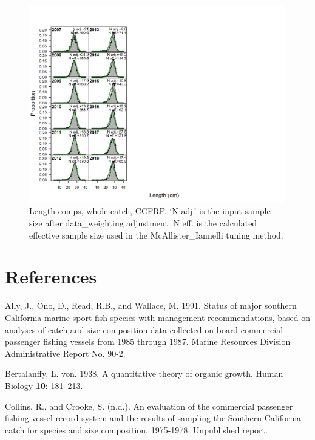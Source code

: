 \documentclass[12pt,]{article}
\begin{document}
\begin{figure}
\centering
\includegraphics{./r4ss/plots_mod1/comp_lenfit_flt9mkt0.png}
\caption{Length comps, whole catch, CCFRP. `N adj.' is the input sample
size after data\_weighting adjustment. N eff. is the calculated
effective sample size used in the McAllister\_Iannelli tuning method.
\label{fig:mod1_7_comp_lenfit_flt9mkt0}}
\end{figure}

\newpage

\color{black}

\section*{References}\label{references}

\renewcommand{\thepage}{}

\hypertarget{refs}{}
\hypertarget{ref-Ally1991}{}
Ally, J., Ono, D., Read, R.B., and Wallace, M. 1991. Status of major
southern California marine sport fish species with management
recommendations, based on analyses of catch and size composition data
collected on board commercial passenger fishing vessels from 1985
through 1987. Marine Resources Division Administrative Report No. 90-2.

\hypertarget{ref-vonB1938}{}
Bertalanffy, L. von. 1938. A quantitative theory of organic growth.
Human Biology \textbf{10}: 181--213.

\hypertarget{ref-Collins1978}{}
Collins, R., and Crooke, S. (n.d.). An evaluation of the commercial
passenger fishing vessel record system and the results of sampling the
Southern California catch for species and size composition, 1975-1978.
Unpublished report.
\end{document}

